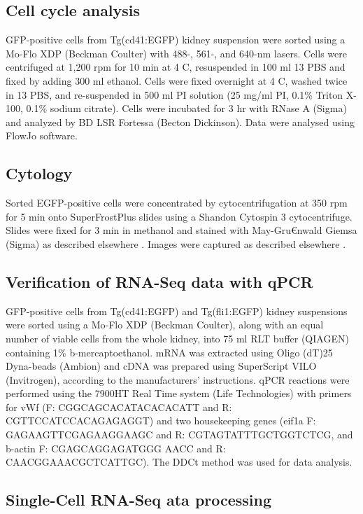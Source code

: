 \subsection{Cell cycle analysis}

GFP-positive cells from Tg(cd41:EGFP) kidney suspension were sorted using a Mo-Flo XDP (Beckman Coulter) with 488-, 561-, and 640-nm lasers. Cells were centrifuged at 1,200 rpm for 10 min at 4 C, resuspended in 100 ml 13 PBS and fixed by adding 300 ml ethanol. Cells were fixed overnight at 4 C, washed twice in 13 PBS, and re-suspended in 500 ml PI solution (25 mg/ml PI, 0.1\% Triton X-100, 0.1\% sodium citrate). Cells were incubated for 3 hr with RNase A (Sigma) and analyzed by BD LSR Fortessa (Becton Dickinson). Data were analysed using FlowJo software.

\subsection{Cytology}

Sorted EGFP-positive cells were concentrated by cytocentrifugation at 350 rpm for 5 min onto SuperFrostPlus slides using a Shandon Cytospin 3 cytocentrifuge. Slides were fixed for 3 min in methanol and stained with May-Gru€nwald Giemsa (Sigma) as described elsewhere \cite{Stachura2009-gd}. Images were captured as described elsewhere \cite{Bielczyk-Maczynska2014-hf}.

\subsection{Verification of RNA-Seq data with qPCR}

GFP-positive cells from Tg(cd41:EGFP) and Tg(fli1:EGFP) kidney suspensions were sorted using a Mo-Flo XDP (Beckman Coulter), along with an equal number of viable cells from the whole kidney, into 75 ml RLT buffer (QIAGEN) containing 1\% b-mercaptoethanol. mRNA was extracted using Oligo (dT)25 Dyna-beads (Ambion) and cDNA was prepared using SuperScript VILO (Invitrogen), according to the manufacturers’ instructions. qPCR reactions were performed using the 7900HT Real Time system (Life Technologies) with primers for vWf (F: CGGCAGCACATACACACATT and R: CGTTCCATCCACAGAGAGGT) and two housekeeping genes (eif1a F: GAGAAGTTCGAGAAGGAAGC and R: CGTAGTATTTGCTGGTCTCG, and b-actin F: CGAGCAGGAGATGGG AACC and R: CAACGGAAACGCTCATTGC). The DDCt method was used for data analysis.

\subsection{Single-Cell RNA-Seq ata processing}

